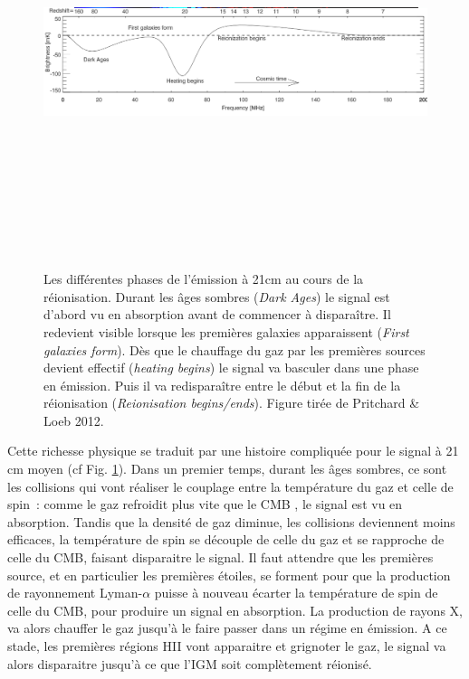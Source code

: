 \begin{figure}[htbp]
	\centering
		\includegraphics[height=12cm]{figs/21cm.png}
		\caption[L'histoire du signal à 21cm de la réionisation]{Les différentes phases de l'émission à 21cm au cours de la réionisation. Durant les âges sombres (\textit{Dark Ages}) le signal est d'abord vu en absorption avant de commencer à disparaître. Il redevient visible lorsque les premières galaxies apparaissent (\textit{First galaxies form}). Dès que le chauffage du gaz par les premières sources devient effectif (\textit{heating begins}) le signal va basculer dans une phase en émission. Puis il va redisparaître entre le début et la fin de la réionisation (\textit{Reionisation begins/ends}). Figure tirée de Pritchard \& Loeb 2012.}
	\label{f:21cm}
\end{figure} 

Cette richesse physique se traduit par une histoire compliquée pour le signal à 21 cm moyen (cf Fig. \ref{f:21cm}). Dans un premier temps, durant les âges sombres, ce sont les collisions qui vont réaliser le couplage entre la température du gaz et celle de spin~: comme le gaz refroidit plus vite que le CMB , le signal est vu en absorption. Tandis que la densité de gaz diminue, les collisions deviennent moins efficaces, la température de spin se découple de celle du gaz et se rapproche de celle du CMB, faisant disparaitre le signal. Il faut attendre que les premières source, et en particulier les premières étoiles, se forment pour que la production de rayonnement Lyman-$\alpha$ puisse à nouveau écarter la température de spin de celle du CMB, pour produire un signal en absorption. La production de rayons X, va alors chauffer le gaz jusqu'à le faire passer dans un régime en émission. A ce stade, les premières régions HII vont apparaitre et grignoter le gaz, le signal va alors disparaitre jusqu'à ce que l'IGM soit complètement réionisé.

